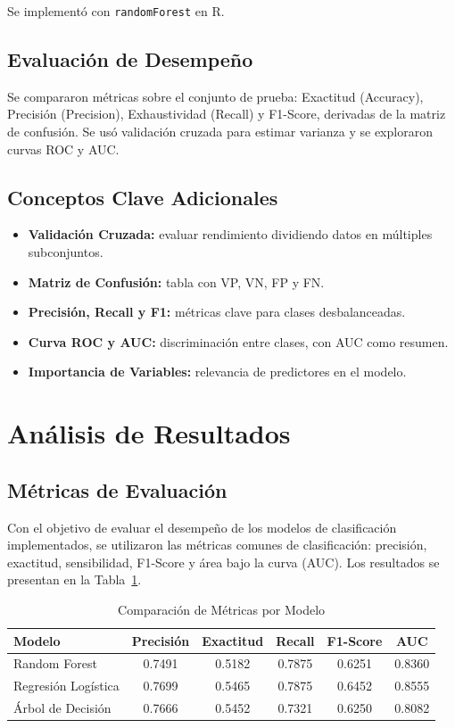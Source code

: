 \documentclass[conference]{IEEEtran}
\begin{document}
Se implementó con \texttt{randomForest} en R.

\subsection{Evaluación de Desempeño}
Se compararon métricas sobre el conjunto de prueba: Exactitud (Accuracy), Precisión (Precision), Exhaustividad (Recall) y F1-Score, derivadas de la matriz de confusión. Se usó validación cruzada para estimar varianza y se exploraron curvas ROC y AUC.

\subsection{Conceptos Clave Adicionales}
\begin{itemize}
	\item \textbf{Validación Cruzada:} evaluar rendimiento dividiendo datos en múltiples subconjuntos.
	\item \textbf{Matriz de Confusión:} tabla con VP, VN, FP y FN.
	\item \textbf{Precisión, Recall y F1:} métricas clave para clases desbalanceadas.
	\item \textbf{Curva ROC y AUC:} discriminación entre clases, con AUC como resumen.
	\item \textbf{Importancia de Variables:} relevancia de predictores en el modelo.
\end{itemize}

\FloatBarrier
\section{Análisis de Resultados}
\subsection{Métricas de Evaluación}
Con el objetivo de evaluar el desempeño de los modelos de clasificación implementados, se utilizaron las métricas comunes de clasificación: precisión, exactitud, sensibilidad, F1-Score y área bajo la curva (AUC). Los resultados se presentan en la Tabla~\ref{tab:metrics}.

\begin{table}[htbp]
	\centering
	\caption{Comparación de Métricas por Modelo}
	\label{tab:metrics}
	\begin{tabular}{lccccc}
		\hline
		\textbf{Modelo}     & \textbf{Precisión} & \textbf{Exactitud} & \textbf{Recall} & \textbf{F1-Score} & \textbf{AUC} \\
		\hline
		Random Forest       & 0.7491             & 0.5182             & 0.7875          & 0.6251            & 0.8360       \\
		Regresión Logística & 0.7699             & 0.5465             & 0.7875          & 0.6452            & 0.8555       \\
		Árbol de Decisión   & 0.7666             & 0.5452             & 0.7321          & 0.6250            & 0.8082       \\
		\hline
	\end{tabular}
\end{table}
\end{document}
